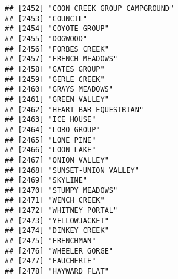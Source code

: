 \documentclass[
]{article}
\begin{document}
\begin{verbatim}
## [2452] "COON CREEK GROUP CAMPGROUND"                                                         
## [2453] "COUNCIL"                                                                             
## [2454] "COYOTE GROUP"                                                                        
## [2455] "DOGWOOD"                                                                             
## [2456] "FORBES CREEK"                                                                        
## [2457] "FRENCH MEADOWS"                                                                      
## [2458] "GATES GROUP"                                                                         
## [2459] "GERLE CREEK"                                                                         
## [2460] "GRAYS MEADOWS"                                                                       
## [2461] "GREEN VALLEY"                                                                        
## [2462] "HEART BAR EQUESTRIAN"                                                                
## [2463] "ICE HOUSE"                                                                           
## [2464] "LOBO GROUP"                                                                          
## [2465] "LONE PINE"                                                                           
## [2466] "LOON LAKE"                                                                           
## [2467] "ONION VALLEY"                                                                        
## [2468] "SUNSET-UNION VALLEY"                                                                 
## [2469] "SKYLINE"                                                                             
## [2470] "STUMPY MEADOWS"                                                                      
## [2471] "WENCH CREEK"                                                                         
## [2472] "WHITNEY PORTAL"                                                                      
## [2473] "YELLOWJACKET"                                                                        
## [2474] "DINKEY CREEK"                                                                        
## [2475] "FRENCHMAN"                                                                           
## [2476] "WHEELER GORGE"                                                                       
## [2477] "FAUCHERIE"                                                                           
## [2478] "HAYWARD FLAT"                                                                        

\end{verbatim}
\end{document}
